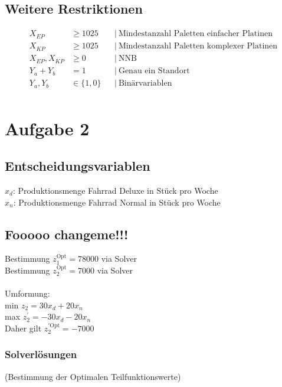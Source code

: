\documentclass[a4paper,11pt]{article}
\begin{document}
\subsection*{Weitere Restriktionen}
\begin{align*}
X_{EP} &\ge 1025 && \big|~ \text{Mindestanzahl Paletten einfacher Platinen} \\
X_{KP} &\ge 1025 && \big|~ \text{Mindestanzahl Paletten komplexer Platinen} \\
X_{EP}, X_{KP} &\ge 0 && \big|~ \text{NNB} \\
Y_a + Y_b &= 1 && \big|~ \text{Genau ein Standort} \\
Y_a , Y_b &\in \{ 1,0 \} && \big|~ \text{Binärvariablen} \\
\end{align*}


\section*{Aufgabe 2}

\subsection*{Entscheidungsvariablen}
$x_{d}$: Produktionsmenge Fahrrad Deluxe in Stück pro Woche \\
$x_{n}$: Produktionsmenge Fahrrad Normal in Stück pro Woche \\


\subsection*{Fooooo changeme!!!}
Bestimmung $z_{1}^{\text{Opt}} = 78000$ via Solver \\
Bestimmung $z_{2}^{\text{Opt}} = 7000$ via Solver \\~\\
Umformung: \\
min $z_{2} = 30x_{d} +20x_{n}$ \\
max $z_{2}^{'} = -30x_{d} -20x_{n}$ \\
Daher gilt $z_{2}^{'\text{Opt}} = -7000$ \\
\vspace{4mm}

\subsubsection*{Solverlösungen}
(Bestimmung der Optimalen Teilfunktionswerte) \\~\\
\end{document}
